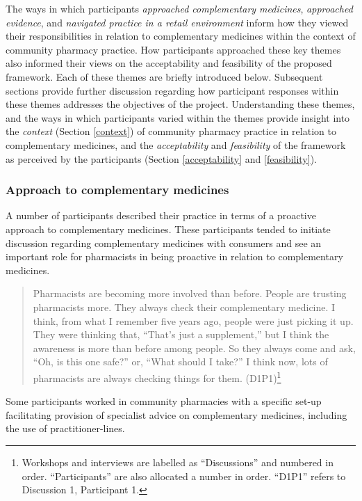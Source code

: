 \documentclass[12pt,]{article}
\begin{document}


The ways in which participants \emph{approached complementary
medicines}, \emph{approached evidence}, and \emph{navigated practice in
a retail environment} inform how they viewed their responsibilities in
relation to complementary medicines within the context of community
pharmacy practice. How participants approached these key themes also
informed their views on the acceptability and feasibility of the
proposed framework. Each of these themes are briefly introduced below.
Subsequent sections provide further discussion regarding how participant
responses within these themes addresses the objectives of the project.
Understanding these themes, and the ways in which participants varied
within the themes provide insight into the \emph{context} (Section
\ref{context}) of community pharmacy practice in relation to
complementary medicines, and the \emph{acceptability} and
\emph{feasibility} of the framework as perceived by the participants
(Section \ref{acceptability} and \ref{feasibility}).

\subsubsection{Approach to complementary
medicines}\label{approach-to-complementary-medicines}

A number of participants described their practice in terms of a
proactive approach to complementary medicines. These participants tended
to initiate discussion regarding complementary medicines with consumers
and see an important role for pharmacists in being proactive in relation
to complementary medicines.

\begin{quote}
Pharmacists are becoming more involved than before. People are trusting
pharmacists more. They always check their complementary medicine. I
think, from what I remember five years ago, people were just picking it
up. They were thinking that, ``That's just a supplement,'' but I think
the awareness is more than before among people. So they always come and
ask, ``Oh, is this one safe?'' or, ``What should I take?'' I think now,
lots of pharmacists are always checking things for them.
(D1P1)\footnote{Workshops and interviews are labelled as ``Discussions''
  and numbered in order. ``Participants'' are also allocated a number in
  order. ``D1P1'' refers to Discussion 1, Participant 1.}
\end{quote}

Some participants worked in community pharmacies with a specific set-up
facilitating provision of specialist advice on complementary medicines,
including the use of practitioner-lines.
\end{document}
